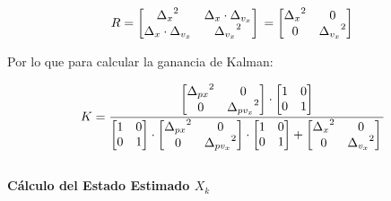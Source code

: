  $$ R =
    \begin{bmatrix}
    {\Delta_x}^2 & \Delta_x \cdot \Delta_{v_x} \\
    \Delta_x \cdot \Delta_{v_x} & {\Delta_{v_x}}^2 \\
    \end{bmatrix} \\ 
    =
    \begin{bmatrix}
    {\Delta_x}^2 & 0 \\
    0 & {\Delta_{v_x}}^2 \\
    \end{bmatrix} \\ 
$$

Por lo que para calcular la ganancia de Kalman:

$$ K =
    \frac{
        \begin{bmatrix}
        {\Delta_{px}}^2 & 0 \\
        0 & {\Delta_{pv_x}}^2 \\
        \end{bmatrix}
        \cdot
        \begin{bmatrix}
        1 & 0 \\
        0 & 1  \\
        \end{bmatrix}
        }
    {
        \begin{bmatrix}
        1 & 0 \\
        0 & 1  \\
        \end{bmatrix}
        \cdot
        \begin{bmatrix}
        {\Delta_{px}}^2 & 0 \\
        0 & {\Delta_{pv_x}}^2 \\
        \end{bmatrix}
        \cdot
        \begin{bmatrix}
        1 & 0 \\
        0 & 1  \\
        \end{bmatrix}
        +
        \begin{bmatrix}
        {\Delta_x}^2 & 0 \\
        0 & {\Delta_{v_x}}^2 \\
        \end{bmatrix} \\ 
    }
$$ \\

\textbf{Cálculo del Estado Estimado $X_k$} \mbox{} \vspace{8pt}

